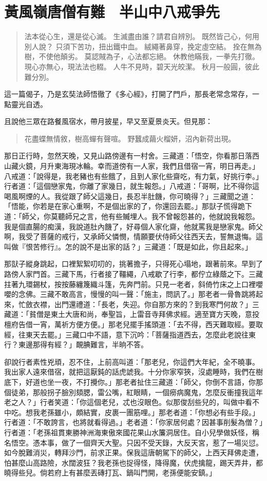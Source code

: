 
\chapter{黃風嶺唐僧有難　半山中八戒爭先}

\begin{quote}
法本從心生，還是從心滅。
生滅盡由誰？請君自辨別。
既然皆己心，何用別人說？
只須下苦功，扭出鐵中血。
絨繩著鼻穿，挽定虛空結。
拴在無為樹，不使他顛劣。
莫認賊為子，心法都忘絕。
休教他瞞我，一拳先打徹。
現心亦無心，現法法也輟。
人牛不見時，碧天光皎潔。
秋月一般圓，彼此難分別。
\end{quote}

這一篇偈子，乃是玄奘法師悟徹了《多心經》，打開了門戶，那長老常念常存，一點靈光自透。

且說他三眾在路餐風宿水，帶月披星，早又至夏景炎天。但見那：
\begin{quote}
花盡蝶無情敘，樹高蟬有聲喧。
野蠶成繭火榴妍，沼內新荷出現。
\end{quote}

那日正行時，忽然天晚，又見山路傍邊有一村舍。三藏道：「悟空，你看那日落西山藏火鏡，月升東海現冰輪。幸而道傍有一人家，我們且借宿一宵，明日再走。」八戒道：「說得是，我老豬也有些餓了，且到人家化些齋吃，有力氣，好挑行李。」行者道：「這個戀家鬼，你離了家幾日，就生報怨。」八戒道：「哥啊，比不得你這喝風啊煙的人。我從跟了師父這幾日，長忍半肚饑，你可曉得？」三藏聞之道：「悟能，你若是在家心重啊，不是個出家的了，你還回去罷。」那獃子慌得跪下道：「師父，你莫聽師兄之言，他有些贓埋人。我不曾報怨甚的，他就說我報怨。我是個直腸的痴漢，我說道肚內饑了，好尋個人家化齋，他就罵我是戀家鬼。師父啊，我受了菩薩的戒行，又承師父憐憫，情願要伏侍師父往西天去，誓無退悔。這叫做『恨苦修行』。怎的說不是出家的話？」三藏道：「既是如此，你且起來。」

那獃子縱身跳起，口裡絮絮叨叨的，挑著擔子，只得死心塌地，跟著前來。早到了路傍人家門首。三藏下馬，行者接了韁繩，八戒歇了行李，都佇立綠蔭之下。三藏拄著九環錫杖，按按藤纏篾織斗篷，先奔門前。只見一老者，斜倚竹床之上口裡嚶嚶的念佛。三藏不敢高言，慢慢的叫一聲：「施主，問訊了。」那老者一骨魯跳將起來，忙斂衣襟，出門還禮道：「長老，失迎。你自那方來的？到我寒門何故？」三藏道：「貧僧是東土大唐和尚，奉聖旨，上雷音寺拜佛求經。適至寶方天晚，意投檀府告借一宵，萬祈方便方便。」那老兒擺手搖頭道：「去不得，西天難取經。要取經，往東天去罷。」三藏口中不語，意下沉吟：「菩薩指道西去，怎麼此老說往東行？東邊那得有經？」靦腆難言，半晌不答。

卻說行者素性兇頑，忍不住，上前高叫道：「那老兒，你這們大年紀，全不曉事。我出家人遠來借宿，就把這厭鈍的話虎諕我。十分你家窄狹，沒處睡時，我們在樹底下，好道也坐一夜，不打攪你。」那老者扯住三藏道：「師父，你倒不言語，你那個徒弟，那般拐子臉別頦腮，雷公嘴，紅眼睛，一個癆病魔鬼，怎麼反衝撞我這年老之人？」行者笑道：「你這個老兒，忒也沒眼色。似那俊刮些兒的，叫做中看不中吃。想我老孫雖小，頗結實，皮裹一團筋哩。」那老者道：「你想必有些手段。」行者道：「不敢誇言，也將就看得過。」老者道：「你家居何處？因甚事削髮為僧？」行者道：「老孫祖貫東勝神洲海東傲來國花果山水簾洞居住。自小兒學做妖怪，稱名悟空。憑本事，做了一個齊天大聖。只因不受天錄，大反天宮，惹了一場災愆。如今脫難消災，轉拜沙門，前求正果。保我這唐朝駕下的師父，上西天拜佛走遭，怕甚麼山高路險，水闊波狂？我老孫也捉得怪，降得魔，伏虎擒龍，踢天弄井，都曉得些兒。倘若府上有甚麼丟磚打瓦、鍋叫門開，老孫便能安鎮。」

